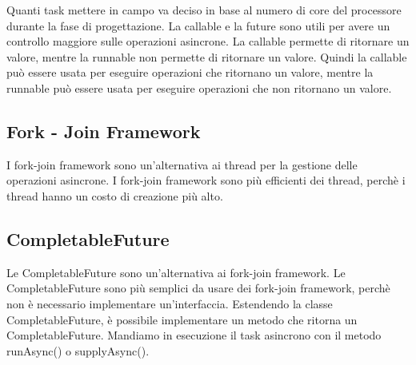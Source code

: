 \documentclass[11pt]{article}
\begin{document}
    Quanti task mettere in campo va deciso in base al numero di core del processore durante la fase di progettazione.
    La callable e la future sono utili per avere un controllo maggiore sulle operazioni asincrone.
    La callable permette di ritornare un valore, mentre la runnable non permette di ritornare un valore.
    Quindi la callable pu\`o essere usata per eseguire operazioni che ritornano un valore, mentre la runnable pu\`o essere usata per eseguire
    operazioni che non ritornano un valore.

    \subsection{Fork - Join Framework}\label{subsec:fork-join-framework}

    I fork-join framework sono un'alternativa ai thread per la gestione delle operazioni asincrone.
    I fork-join framework sono pi\`u efficienti dei thread, perch\`e i thread hanno un costo di creazione pi\`u alto.

    \subsection{CompletableFuture}\label{subsec:completable-future}
    Le CompletableFuture sono un'alternativa ai fork-join framework.
    Le CompletableFuture sono pi\`u semplici da usare dei fork-join framework, perch\`e non \`e necessario implementare un'interfaccia.
    Estendendo la classe CompletableFuture, \`e possibile implementare un metodo che ritorna un CompletableFuture.
    Mandiamo in esecuzione il task asincrono con il metodo runAsync() o supplyAsync().
\end{document}

